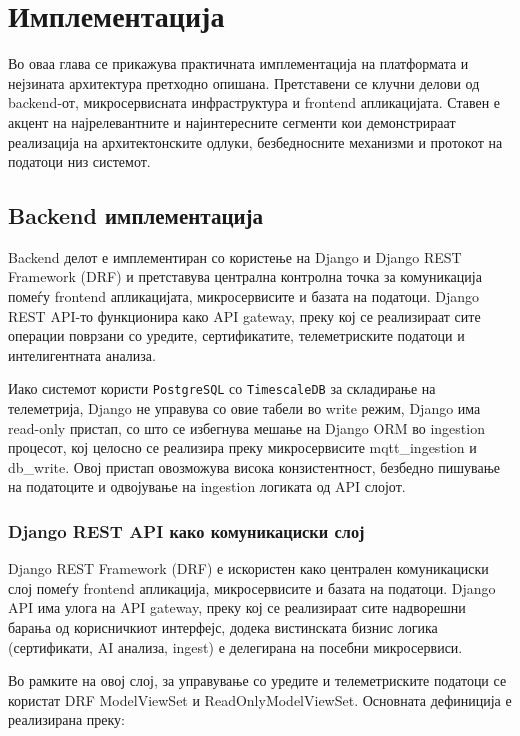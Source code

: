\newpage

\section{Имплементација}

Во оваа глава се прикажува практичната имплементација на платформата и
нејзината архитектура претходно опишана. Претставени се клучни делови од
backend-от, микросервисната инфраструктура и frontend апликацијата.
Ставен е акцент на најрелевантните и најинтересните сегменти кои
демонстрираат реализација на архитектонските одлуки, безбедносните
механизми и протокот на податоци низ системот.

\subsection{Backend имплементација}

Backend делот е имплементиран со користење на Django и Django REST
Framework (DRF) и претставува централна контролна точка за комуникација
помеѓу frontend апликацијата, микросервисите и базата на податоци.
Django REST API-то функционира како API gateway, преку кој се
реализираат сите операции поврзани со уредите, сертификатите,
телеметриските податоци и интелигентната анализа.

Иако системот користи \texttt{PostgreSQL} со \texttt{TimescaleDB} за складирање на
телеметрија, Django не управува со овие табели во write режим, Django
има read-only пристап, со што се избегнува мешање на Django ORM во
ingestion процесот, кој целосно се реализира преку микросервисите
mqtt\_ingestion и db\_write. Овој пристап овозможува висока
конзистентност, безбедно пишување на податоците и одвојување на
ingestion логиката од API слојот.

\subsubsection{Django REST API како комуникациски слој}

Django REST Framework (DRF) е искористен како централен комуникациски
слој помеѓу frontend апликација, микросервисите и базата на податоци.
Django API има улога на API gateway, преку кој се реализираат сите
надворешни барања од корисничкиот интерфејс, додека вистинската бизнис
логика (сертификати, AI анализа, ingest) е делегирана на посебни
микросервиси.

Во рамките на овој слој, за управување со уредите и телеметриските
податоци се користат DRF ModelViewSet и ReadOnlyModelViewSet. Основната
дефиниција е реализирана преку:

